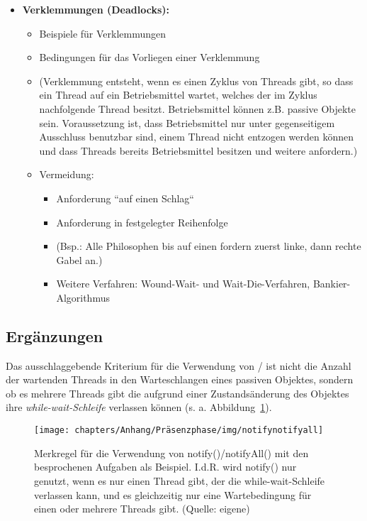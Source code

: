 \begin{itemize}
        \item \textbf{Verklemmungen (Deadlocks):}
        \begin{itemize}
            \item Beispiele für Verklemmungen
            \item Bedingungen für das Vorliegen einer Verklemmung
            \item[] (Verklemmung entsteht, wenn es einen Zyklus von Threads gibt, so dass ein Thread auf ein Betriebsmittel wartet, welches der im Zyklus nachfolgende Thread besitzt. Betriebsmittel können z.B. passive Objekte sein. Voraussetzung ist, dass Betriebsmittel nur unter gegenseitigem Ausschluss benutzbar sind, einem Thread nicht entzogen werden können und dass Threads bereits Betriebsmittel besitzen und weitere anfordern.)
            \item Vermeidung:
            \begin{itemize}
                \item Anforderung ``auf einen Schlag``
                \item Anforderung in festgelegter Reihenfolge
                \item[] (Bsp.: Alle Philosophen bis auf einen fordern zuerst linke, dann rechte Gabel an.)
                \item Weitere Verfahren: Wound-Wait- und Wait-Die-Verfahren, Bankier-Algorithmus
            \end{itemize}
        \end{itemize}

    \end{itemize}

\subsection{Ergänzungen}
\begin{tcolorbox}
    Das ausschlaggebende Kriterium für die Verwendung von  /  ist nicht die Anzahl der wartenden Threads in den Warteschlangen eines passiven Objektes, sondern ob es mehrere Threads gibt die aufgrund einer Zustandsänderung des Objektes ihre \textit{while-wait-Schleife} verlassen können (s. a. Abbildung~\ref{fig:notifynotifyall}).
\end{tcolorbox}

\begin{figure}
    \centering
    \texttt{[image: chapters/Anhang/Präsenzphase/img/notifynotifyall]}
    \caption{Merkregel für die Verwendung von notify()/notifyAll() mit den besprochenen Aufgaben als Beispiel. I.d.R. wird notify() nur genutzt, wenn es nur einen Thread gibt, der die while-wait-Schleife verlassen kann, und es gleichzeitig nur eine Wartebedingung für einen oder mehrere Threads gibt. (Quelle: eigene)}
    \label{fig:notifynotifyall}
\end{figure}


